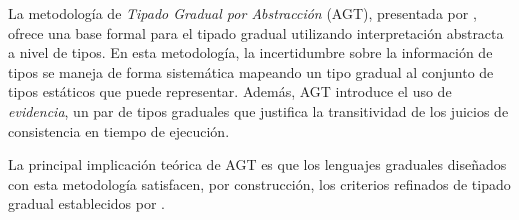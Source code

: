 La metodología de \textit{Tipado Gradual por Abstracción} (AGT), presentada por \citet{agt}, ofrece una base formal para el tipado gradual utilizando interpretación abstracta a nivel de tipos. En esta metodología, la incertidumbre sobre la información de tipos se maneja de forma sistemática mapeando un tipo gradual al conjunto de tipos estáticos que puede representar. Además, AGT introduce el uso de \emph{evidencia}, un par de tipos graduales que justifica la transitividad de los juicios de consistencia en tiempo de ejecución.

La principal implicación teórica de AGT es que los lenguajes graduales diseñados con esta metodología satisfacen, por construcción, los criterios refinados de tipado gradual establecidos por \citet{refined}.
